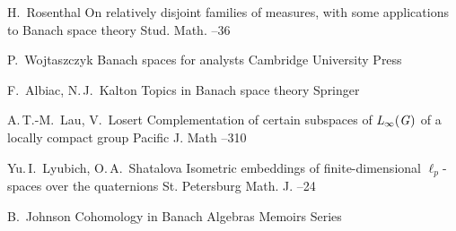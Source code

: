\documentclass{article}
\numberwithin{equation}{section}
\theoremstyle{plain}
\theoremstyle{definition}
\begin{document}
\begin{thebibliography}{99}
\by H.~Rosenthal
\paper On relatively disjoint families of measures, with some applications to Banach space theory
\jour Stud. Math. 
--36

\by P.~Wojtaszczyk 
\book Banach spaces for analysts 
\publ Cambridge University Press

\by F.~Albiac, N.\,J.~Kalton 
\book Topics in Banach space theory
\publ Springer

\by A.\,T.-M.~Lau,  V.~Losert
\paper Complementation of certain subspaces of $\it{L_\infty(G)}$ of a locally compact group
\jour Pacific J. Math
--310

\by Yu.\,I.~Lyubich, O.\,A.~Shatalova
\paper Isometric embeddings of finite-dimensional $\ell_p$-spaces over the quaternions
\jour St. Petersburg Math. J.
--24

\by B.~Johnson
\book Cohomology in Banach Algebras 
\publ Memoirs Series

\end{thebibliography}
\end{document}
